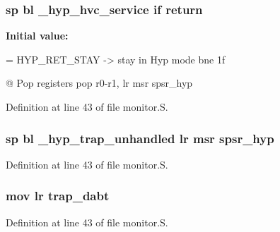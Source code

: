 \hypertarget{monitor_8_s_afb820df2c9dbd34b23c1372ce18de4a8}{
\subsubsection[{return}]{\setlength{\rightskip}{0pt plus 5cm}sp bl {\bf \-\_\-hyp\-\_\-hvc\-\_\-service} if {\bf return}}}\label{monitor_8_s_afb820df2c9dbd34b23c1372ce18de4a8}
{\bfseries \-Initial value\-:}
\begin{DoxyCode}
= HYP_RET_STAY -> stay in Hyp mode 
    bne 1f          
    
    @ Pop registers
    pop     {r0-r1, lr}
    msr     spsr_hyp
\end{DoxyCode}


\-Definition at line 43 of file monitor.\-S.

\hypertarget{monitor_8_s_a12f8aefcae70cf8def5efce7fa6e8ecf}{
\subsubsection[{spsr\-\_\-hyp}]{\setlength{\rightskip}{0pt plus 5cm}sp bl {\bf \-\_\-hyp\-\_\-trap\-\_\-unhandled} {\bf lr} msr {\bf spsr\-\_\-hyp}}}\label{monitor_8_s_a12f8aefcae70cf8def5efce7fa6e8ecf}


\-Definition at line 43 of file monitor.\-S.

\hypertarget{monitor_8_s_a81814ef2d4e0eec675fbcdd2fc5d771b}{
\subsubsection[{trap\-\_\-dabt}]{ mov {\bf lr} {\bf trap\-\_\-dabt}}}\label{monitor_8_s_a81814ef2d4e0eec675fbcdd2fc5d771b}


\-Definition at line 43 of file monitor.\-S.

